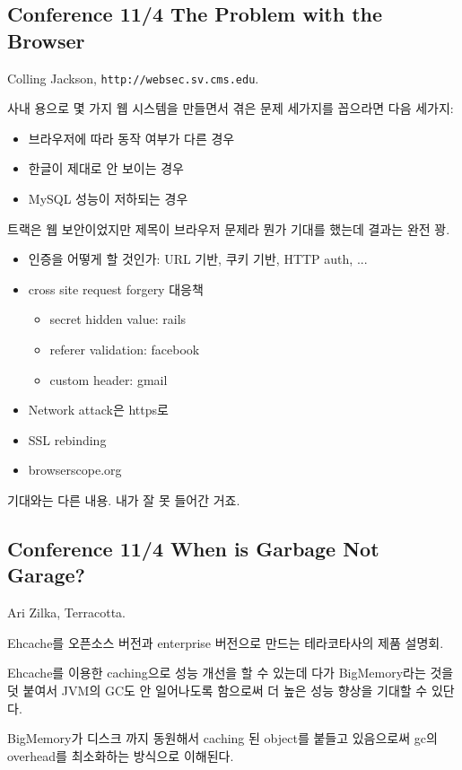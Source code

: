 \documentclass[a4paper]{article}
\begin{document}
\subsection{Conference 11/4 The Problem with the Browser}
 
Colling Jackson, \texttt{http://websec.sv.cms.edu}.
 
사내 용으로 몇 가지 웹 시스템을 만들면서 겪은 문제 세가지를 꼽으라면 다음 
세가지:
\begin{itemize}
\item 브라우저에 따라 동작 여부가 다른 경우
\item 한글이 제대로 안 보이는 경우
\item MySQL 성능이 저하되는 경우
\end{itemize}
 
트랙은 웹 보안이었지만 제목이 브라우저 문제라 뭔가 기대를 했는데 결과는 완전 꽝.
 
\begin{itemize}
\item 인증을 어떻게 할 것인가: URL 기반, 쿠키 기반, HTTP auth, ...
\item cross site request forgery 대응책
    \begin{itemize}
    \item secret hidden value: rails
    \item referer validation: facebook
    \item custom header: gmail
    \end{itemize}
\item Network  attack은 https로 
\item SSL rebinding
\item browserscope.org 
\end{itemize}
 
기대와는 다른 내용. 내가 잘 못 들어간 거죠.
 
\subsection{Conference 11/4 When is Garbage Not Garage?}
 
Ari Zilka, Terracotta.
 
Ehcache를 오픈소스 버전과 enterprise 버전으로 만드는 테라코타사의 제품 설명회.
 
Ehcache를 이용한 caching으로 성능 개선을 할 수 있는데 다가
BigMemory라는 것을 덧 붙여서 JVM의 GC도 안 일어나도록 함으로써 더 높은
성능 향상을 기대할 수 있단다.
 
BigMemory가 디스크 까지 동원해서 caching 된 object를 붙들고 있음으로써
gc의 overhead를 최소화하는 방식으로 이해된다.
 
\end{document}
